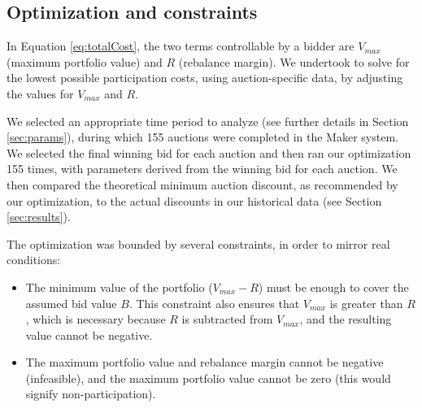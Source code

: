 \documentclass[conference]{IEEEtran}
\begin{document}
\subsection{Optimization and constraints}

In Equation \eqref{eq:totalCost}, the two terms controllable by a bidder are $V_{max}$ (maximum portfolio value) and $R$ (rebalance margin). We undertook to solve for the lowest possible participation costs, using auction-specific data, by adjusting the values for $V_{max}$ and $R$. 

We selected an appropriate time period to analyze (see further details in Section \ref{sec:params}), during which 155 auctions were completed in the Maker system. We selected the final winning bid for each auction and then ran our optimization 155 times, with parameters derived from the winning bid for each auction. We then compared the theoretical minimum auction discount, as recommended by our optimization, to the actual discounts in our historical data (see Section \ref{sec:results}).

The optimization was bounded by several constraints, in order to mirror real conditions:

\begin{itemize}
    \item The minimum value of the portfolio ($V_{max}-R$) must be enough to cover the assumed bid value $B$. This constraint also ensures that $V_{max}$ is greater than $R$, which is necessary because $R$ is subtracted from $V_{max}$, and the resulting value cannot be negative.
    \item The maximum portfolio value and rebalance margin cannot be negative (infeasible), and the maximum portfolio value cannot be zero (this would signify non-participation).
\end{itemize}
\end{document}
